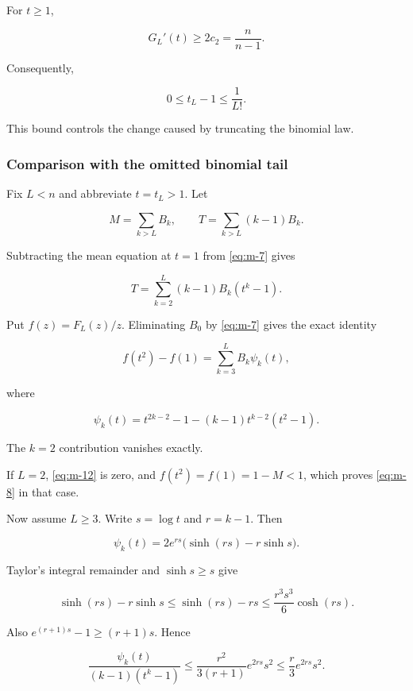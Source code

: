 \documentclass[11pt,a4paper]{article}
\theoremstyle{definition}
\theoremstyle{remark}
\begin{document}
For \(t\ge1\),

\[
G_L'(t)\ge2c_2=\frac{n}{n-1}.
\]

Consequently,

\begin{equation}\label{eq:m-10}
\boxed{\ 0\le t_L-1\le\frac1{L!}.\ }
\end{equation}

This bound controls the change caused by truncating the binomial law.

\subsubsection{Comparison with the omitted binomial
tail}\label{scalar-comparison-with-the-omitted-binomial-tail}

Fix \(L<n\) and abbreviate \(t=t_L>1\). Let

\[
M=\sum_{k>L}B_k,\qquad
T=\sum_{k>L}(k-1)B_k.
\]

Subtracting the mean equation at \(t=1\) from \eqref{eq:m-7} gives

\begin{equation}\label{eq:m-11}
T=\sum_{k=2}^L(k-1)B_k(t^k-1).
\end{equation}

Put \(f(z)=F_L(z)/z\). Eliminating \(B_0\) by \eqref{eq:m-7} gives the exact
identity

\begin{equation}\label{eq:m-12}
f(t^2)-f(1)=\sum_{k=3}^LB_k\psi_k(t),
\end{equation}

where

\[
\psi_k(t)=t^{2k-2}-1-(k-1)t^{k-2}(t^2-1).
\]

The \(k=2\) contribution vanishes exactly.

If \(L=2\), \eqref{eq:m-12} is zero, and \(f(t^2)=f(1)=1-M<1\), which proves
\eqref{eq:m-8} in that case.

Now assume \(L\ge3\). Write \(s=\log t\) and \(r=k-1\). Then

\[
\psi_k(t)=2e^{rs}\bigl(\sinh(rs)-r\sinh s\bigr).
\]

Taylor's integral remainder and \(\sinh s\ge s\) give

\[
\sinh(rs)-r\sinh s
\le \sinh(rs)-rs
\le\frac{r^3s^3}{6}\cosh(rs).
\]

Also \(e^{(r+1)s}-1\ge(r+1)s\). Hence

\[
\frac{\psi_k(t)}{(k-1)(t^k-1)}
\le\frac{r^2}{3(r+1)}e^{2rs}s^2
\le\frac r3e^{2rs}s^2.
\]
\end{document}

